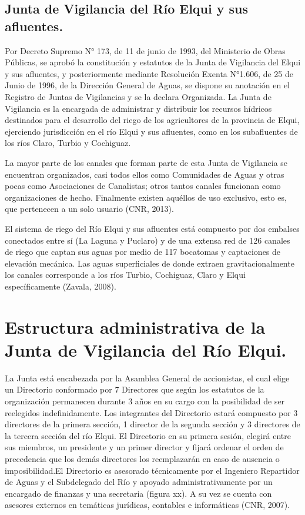 \documentclass[11pt,]{article}
\begin{document}
\subsection{Junta de Vigilancia del Río Elqui y sus afluentes.}
Por Decreto Supremo N° 173, de 11 de junio de 1993, del Ministerio de Obras Públicas, se aprobó la constitución y estatutos de la Junta de Vigilancia del Elqui y sus afluentes, y posteriormente mediante Resolución Exenta N°1.606, de 25 de Junio de 1996, de la Dirección General de Aguas, se dispone su anotación en el Registro de Juntas de Vigilancias y se la declara Organizada. La Junta de Vigilancia es la encargada de administrar y distribuir los recursos hídricos destinados para el desarrollo del riego de los agricultores de la provincia de Elqui, ejerciendo jurisdicción en el río Elqui y sus afluentes, como en los subafluentes de los ríos Claro, Turbio y Cochiguaz.\bigskip 

La mayor parte de los canales que forman parte de esta Junta de Vigilancia se encuentran organizados, casi todos ellos como Comunidades de Aguas y otras pocas como Asociaciones de Canalistas; otros tantos canales funcionan como organizaciones de hecho. Finalmente existen aquéllos de uso exclusivo, esto es, que pertenecen a un solo usuario (CNR, 2013).\bigskip 

El sistema de riego del Río Elqui y sus afluentes está compuesto por dos embalses conectados entre sí (La Laguna y Puclaro) y de una extensa red de 126 canales de riego que captan sus aguas por medio de 117 bocatomas y captaciones de elevación mecánica. Las aguas superficiales de donde extraen gravitacionalmente los canales corresponde a los ríos Turbio, Cochiguaz, Claro y Elqui específicamente (Zavala, 2008).\bigskip 

\section{Estructura administrativa de la Junta de Vigilancia del Río Elqui.}
La Junta está encabezada por la Asamblea General de accionistas, el cual elige un Directorio conformado por 7 Directores que según los estatutos de la organización permanecen durante 3 años en su cargo con la posibilidad de ser reelegidos indefinidamente. Los integrantes del Directorio estará compuesto por 3 directores de la primera sección, 1 director de la segunda sección y 3 directores de la tercera sección del río Elqui.
El Directorio en su primera sesión, elegirá entre sus miembros, un presidente y un primer director y fijará ordenar el orden de precedencia que los demás directores los reemplazarán en caso de ausencia o imposibilidad.El Directorio es asesorado técnicamente por el Ingeniero Repartidor de Aguas y el Subdelegado del Río y apoyado administrativamente por un encargado de finanzas y una secretaria (figura xx). A su vez se cuenta con asesores externos en temáticas jurídicas, contables e informáticas (CNR, 2007).
\end{document}
